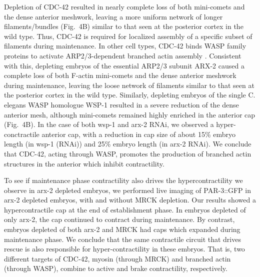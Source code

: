 \documentclass[11pt]{article}
\newcommand{\6}[1]{#1_{\text{6}}}
\newcommand{\3}[1]{#1_{\text{3}}}
\begin{document}
Depletion of CDC-42 resulted in nearly complete loss of both mini-comets and the dense anterior meshwork, leaving a more uniform network of longer filaments/bundles (Fig.\ 4B) similar to that seen at the posterior cortex in the wild type. Thus, CDC-42 is required for localized assembly of a specific subset of filaments during maintenance. In other cell types, CDC-42 binds WASP family proteins to activate ARP2/3-dependent branched actin assembly \citep{pollitt2009wasp}. Consistent with this, depleting embryos of the essential ARP2/3 subunit ARX-2 caused a complete loss of both F-actin mini-comets and the dense anterior meshwork during maintenance, leaving the loose network of filaments similar to that seen at the posterior cortex in the wild type. Similarly, depleting embryos of the single C. elegans WASP homologue WSP-1 resulted in a severe reduction of the dense anterior mesh, although mini-comets remained highly enriched in the anterior cap (Fig.\ 4B). In the case of both wsp-1 and arx-2 RNAi, we observed a hyper-conctractile anterior cap, with a reduction in cap size of about 15\% embryo length (in wsp-1 (RNAi)) and 25\% embryo length (in arx-2 RNAi). We conclude that CDC-42, acting through WASP, promotes the production of branched actin structures in the anterior which inhibit contractility. 

To see if maintenance phase contractility also drives the hypercontractility we observe in arx-2 depleted embryos, we performed live imaging of PAR-3::GFP in arx-2 depleted embryos, with and without MRCK depletion. Our results showed a hypercontractile cap at the end of establishment phase. In embryos depleted of only arx-2, the cap continued to contract during maintenance. By contrast, embryos depleted of both arx-2 and MRCK had caps which expanded during maintenance phase. We conclude that the same contractile circuit that drives rescue is also responsible for hyper-contractility in these embryos. That is, two different targets of CDC-42, myosin (through MRCK) and branched actin (through WASP), combine to active and brake contractility, respectively.
\end{document}
